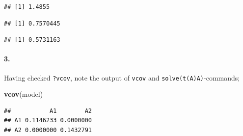 \documentclass[
]{article}
\newenvironment{Shaded}{\begin{snugshade}}{\end{snugshade}}
\newcommand{\CommentTok}[1]{\textcolor[rgb]{0.56,0.35,0.01}{\textit{#1}}}
\newcommand{\DecValTok}[1]{\textcolor[rgb]{0.00,0.00,0.81}{#1}}
\newcommand{\KeywordTok}[1]{\textcolor[rgb]{0.13,0.29,0.53}{\textbf{#1}}}
\newcommand{\NormalTok}[1]{#1}
\newcommand{\OperatorTok}[1]{\textcolor[rgb]{0.81,0.36,0.00}{\textbf{#1}}}
\newcommand{\StringTok}[1]{\textcolor[rgb]{0.31,0.60,0.02}{#1}}
\begin{document}
\begin{verbatim}
## [1] 1.4855
\end{verbatim}

\begin{Shaded}
\end{Shaded}

\begin{verbatim}
## [1] 0.7570445
\end{verbatim}

\begin{Shaded}
\end{Shaded}

\begin{verbatim}
## [1] 0.5731163
\end{verbatim}

\hypertarget{section-46}{%
\paragraph{\texorpdfstring{\textbf{3.}}{3.}}\label{section-46}}

Having checked \texttt{?vcov}, note the output of \texttt{vcov} and
\texttt{solve(t(A)A)}-commands;

\begin{Shaded}
\begin{Highlighting}[]
\KeywordTok{vcov}\NormalTok{(model)}
\end{Highlighting}
\end{Shaded}

\begin{verbatim}
##           A1        A2
## A1 0.1146233 0.0000000
## A2 0.0000000 0.1432791
\end{verbatim}

\begin{Shaded}
\end{Shaded}
\end{document}
